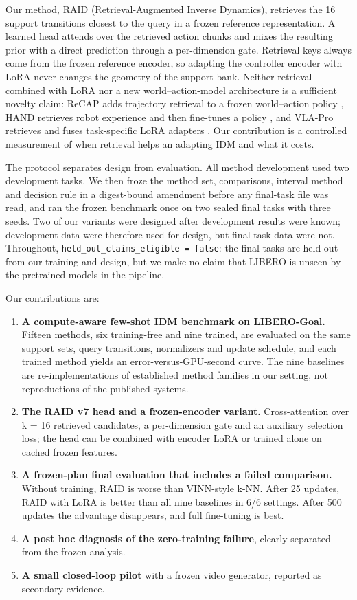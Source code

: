 \documentclass[11pt,a4paper]{article}
\providecommand{\tightlist}{\setlength{\itemsep}{0pt}\setlength{\parskip}{0pt}}
\begin{document}
Our method, RAID (Retrieval-Augmented Inverse Dynamics), retrieves the 16 support transitions closest to the query in a frozen reference representation. A learned head attends over the retrieved action chunks and mixes the resulting prior with a direct prediction through a per-dimension gate. Retrieval keys always come from the frozen reference encoder, so adapting the controller encoder with LoRA never changes the geometry of the support bank. Neither retrieval combined with LoRA nor a new world--action-model architecture is a sufficient novelty claim: ReCAP adds trajectory retrieval to a frozen world--action policy \cite{ref16}, HAND retrieves robot experience and then fine-tunes a policy \cite{ref17}, and VLA-Pro retrieves and fuses task-specific LoRA adapters \cite{ref18}. Our contribution is a controlled measurement of when retrieval helps an adapting IDM and what it costs.

The protocol separates design from evaluation. All method development used two development tasks. We then froze the method set, comparisons, interval method and decision rule in a digest-bound amendment before any final-task file was read, and ran the frozen benchmark once on two sealed final tasks with three seeds. Two of our variants were designed after development results were known; development data were therefore used for design, but final-task data were not. Throughout, \texttt{held\_out\_claims\_eligible\ =\ false}: the final tasks are held out from our training and design, but we make no claim that LIBERO is unseen by the pretrained models in the pipeline.

Our contributions are:

\begin{enumerate}
\def\labelenumi{\arabic{enumi}.}
\tightlist
\item
  \textbf{A compute-aware few-shot IDM benchmark on LIBERO-Goal.} Fifteen methods, six training-free and nine trained, are evaluated on the same support sets, query transitions, normalizers and update schedule, and each trained method yields an error-versus-GPU-second curve. The nine baselines are re-implementations of established method families in our setting, not reproductions of the published systems.
\item
  \textbf{The RAID v7 head and a frozen-encoder variant.} Cross-attention over k = 16 retrieved candidates, a per-dimension gate and an auxiliary selection loss; the head can be combined with encoder LoRA or trained alone on cached frozen features.
\item
  \textbf{A frozen-plan final evaluation that includes a failed comparison.} Without training, RAID is worse than VINN-style k-NN. After 25 updates, RAID with LoRA is better than all nine baselines in 6/6 settings. After 500 updates the advantage disappears, and full fine-tuning is best.
\item
  \textbf{A post hoc diagnosis of the zero-training failure}, clearly separated from the frozen analysis.
\item
  \textbf{A small closed-loop pilot} with a frozen video generator, reported as secondary evidence.
\end{enumerate}
\end{document}
